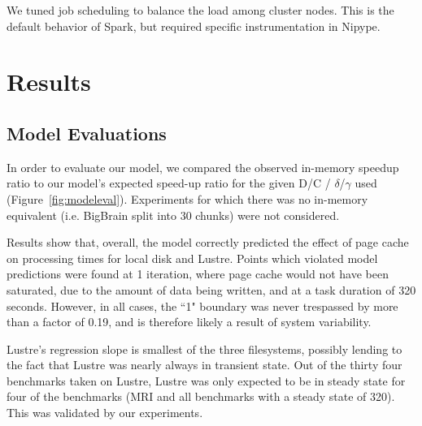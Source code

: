 \documentclass{IEEEtran}
\begin{document}
We tuned job scheduling to balance the load among
cluster nodes. This is the default behavior of Spark, but required
specific instrumentation in Nipype.






\section{Results} %
\label{sec:results}


\subsection{Model Evaluations}

In order to evaluate our model, we compared the observed in-memory speedup 
ratio to our model's expected speed-up ratio for the given 
D/C / $\delta$/$\gamma$ used (Figure~\ref{fig:modeleval}). Experiments for 
which there was no in-memory equivalent (i.e. BigBrain split into 30 chunks) 
were not considered.

Results show that, overall, the model correctly predicted the effect of page 
cache on processing times for local disk and Lustre. Points which violated 
model predictions were found at 1 iteration, where page cache would not have 
been saturated, due to the amount of data being written, and at a task duration
of 320 seconds. However, in all cases, the ``1" boundary was never trespassed by 
more than a factor of 0.19, and is therefore likely a result of system 
variability.

Lustre's regression slope is smallest of the three filesystems, possibly 
lending to the fact that Lustre was nearly always in transient state. Out of 
the thirty four benchmarks taken on Lustre, Lustre was only expected to be in steady 
state for four of the benchmarks (MRI and all benchmarks with a steady state of
320). This was validated by our experiments.
\end{document}

